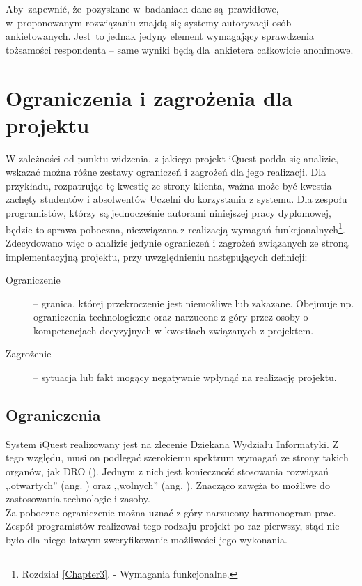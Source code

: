 Aby~zapewnić, że~pozyskane w~badaniach dane są~prawidłowe, w~proponowanym rozwiązaniu znajdą się systemy autoryzacji osób ankietowanych. Jest~to jednak jedyny element wymagający sprawdzenia tożsamości respondenta -- same wyniki będą dla~ankietera całkowicie anonimowe. \\

\section{Ograniczenia i zagrożenia dla projektu}
\label{Chapter12}

W zależności od punktu widzenia, z jakiego projekt iQuest podda się analizie, wskazać można różne zestawy ograniczeń i zagrożeń dla jego realizacji. Dla przykładu, rozpatrując tę kwestię ze strony klienta, ważna może być kwestia zachęty studentów i absolwentów Uczelni do korzystania z systemu. Dla zespołu programistów, którzy są jednocześnie autorami niniejszej pracy dyplomowej, będzie to sprawa poboczna, niezwiązana z realizacją wymagań funkcjonalnych\footnote{Rozdział \ref{Chapter3}. - Wymagania funkcjonalne.}. Zdecydowano więc o analizie jedynie ograniczeń i zagrożeń związanych ze stroną implementacyjną projektu, przy uwzględnieniu następujących definicji:
\begin{description}
\item[Ograniczenie] -- granica, której przekroczenie jest niemożliwe lub zakazane. Obejmuje np. ograniczenia technologiczne oraz narzucone z góry przez osoby o kompetencjach decyzyjnych w kwestiach związanych z projektem.
\item[Zagrożenie] -- sytuacja lub fakt mogący negatywnie wpłynąć na realizację projektu.
\end{description}

\subsection{Ograniczenia}
\label{Chapter121}

System iQuest realizowany jest na zlecenie Dziekana Wydziału Informatyki. Z tego względu, musi on podlegać szerokiemu spektrum wymagań ze strony takich organów, jak DRO (). Jednym z nich jest konieczność stosowania rozwiązań ,,otwartych'' (ang. ) oraz ,,wolnych'' (ang. ). Znacząco zawęża to możliwe do zastosowania technologie i zasoby. \\

Za poboczne ograniczenie można uznać z góry narzucony harmonogram prac. Zespół programistów realizował tego rodzaju projekt po raz pierwszy, stąd nie było dla niego łatwym zweryfikowanie możliwości jego wykonania.

